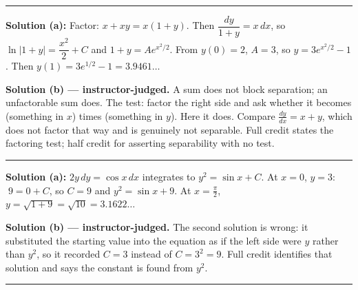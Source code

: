 \documentclass[12pt]{article}
\begin{document}
\vspace{0.2cm}\noindent\rule{\linewidth}{0.2pt}\vspace{0.2cm}


\textbf{Solution (a):} Factor: $x + xy = x(1 + y)$. Then $\dfrac{dy}{1+y} = x\,dx$, so $\ln|1+y| = \dfrac{x^2}{2} + C$ and $1 + y = Ae^{x^2/2}$. From $y(0) = 2$, $A = 3$, so $y = 3e^{x^2/2} - 1$. Then $y(1) = 3e^{1/2} - 1 = 3.9461\ldots$ 

\textbf{Solution (b) --- instructor-judged.} A sum does not block separation; an unfactorable sum does. The test: factor the right side and ask whether it becomes (something in $x$) times (something in $y$). Here it does. Compare $\frac{dy}{dx} = x + y$, which does not factor that way and is genuinely not separable. Full credit states the factoring test; half credit for asserting separability with no test.

\vspace{0.2cm}\noindent\rule{\linewidth}{0.2pt}\vspace{0.2cm}


\textbf{Solution (a):} $2y\,dy = \cos x\,dx$ integrates to $y^2 = \sin x + C$. At $x = 0$, $y = 3$: $\;9 = 0 + C$, so $C = 9$ and $y^2 = \sin x + 9$. At $x = \frac{\pi}{2}$, $y = \sqrt{1 + 9} = \sqrt{10} = 3.1622\ldots$ 

\textbf{Solution (b) --- instructor-judged.} The second solution is wrong: it substituted the starting value into the equation as if the left side were $y$ rather than $y^2$, so it recorded $C = 3$ instead of $C = 3^2 = 9$. Full credit identifies that solution and says the constant is found from $y^2$.

\vspace{0.2cm}\noindent\rule{\linewidth}{0.2pt}\vspace{0.2cm}

\end{document}
